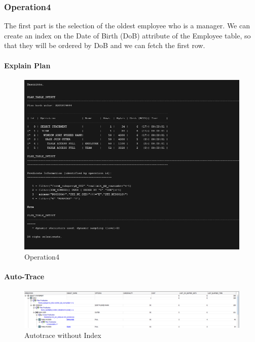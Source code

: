 \subsubsection{Operation4}

The first part is the selection of the oldest employee who is a manager. We can create an index on the Date of Birth (DoB) attribute of the Employee table, so that they will be ordered by DoB and we can fetch the first row.

\paragraph{Explain Plan} \leavevmode \newline

\begin{figure}[H]
    \centering
    \includegraphics[width=\textwidth]{images/ExPlan4.png}
    \caption{Operation4}
\end{figure}

\paragraph{Auto-Trace} \leavevmode \newline

\begin{figure}[H]
    \centering
    \includegraphics[width=\textwidth]{images/OldManNOIndex.png}
    \caption{Autotrace without Index}
\end{figure}

